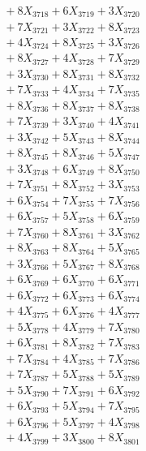 \documentclass[a4paper,10pt]{article}
\begin{document}
{\begin{align}
&\;  + 8 X_{3718} + 6 X_{3719} + 3 X_{3720} \\[0.3ex]
&\;  + 7 X_{3721} + 3 X_{3722} + 8 X_{3723} \\[0.3ex]
&\;  + 4 X_{3724} + 8 X_{3725} + 3 X_{3726} \\[0.3ex]
&\;  + 8 X_{3727} + 4 X_{3728} + 7 X_{3729} \\[0.5ex]\allowbreak
&\;  + 3 X_{3730} + 8 X_{3731} + 8 X_{3732} \\[0.3ex]
&\;  + 7 X_{3733} + 4 X_{3734} + 7 X_{3735} \\[0.3ex]
&\;  + 8 X_{3736} + 8 X_{3737} + 8 X_{3738} \\[0.3ex]
&\;  + 7 X_{3739} + 3 X_{3740} + 4 X_{3741} \\[0.3ex]
&\;  + 3 X_{3742} + 5 X_{3743} + 8 X_{3744} \\[0.3ex]
&\;  + 8 X_{3745} + 8 X_{3746} + 5 X_{3747} \\[0.3ex]
&\;  + 3 X_{3748} + 6 X_{3749} + 8 X_{3750} \\[0.3ex]
&\;  + 7 X_{3751} + 8 X_{3752} + 3 X_{3753} \\[0.3ex]
&\;  + 6 X_{3754} + 7 X_{3755} + 7 X_{3756} \\[0.3ex]
&\;  + 6 X_{3757} + 5 X_{3758} + 6 X_{3759} \\[0.5ex]\allowbreak
&\;  + 7 X_{3760} + 8 X_{3761} + 3 X_{3762} \\[0.3ex]
&\;  + 8 X_{3763} + 8 X_{3764} + 5 X_{3765} \\[0.3ex]
&\;  + 3 X_{3766} + 5 X_{3767} + 8 X_{3768} \\[0.3ex]
&\;  + 6 X_{3769} + 6 X_{3770} + 6 X_{3771} \\[0.3ex]
&\;  + 6 X_{3772} + 6 X_{3773} + 6 X_{3774} \\[0.3ex]
&\;  + 4 X_{3775} + 6 X_{3776} + 4 X_{3777} \\[0.3ex]
&\;  + 5 X_{3778} + 4 X_{3779} + 7 X_{3780} \\[0.3ex]
&\;  + 6 X_{3781} + 8 X_{3782} + 7 X_{3783} \\[0.3ex]
&\;  + 7 X_{3784} + 4 X_{3785} + 7 X_{3786} \\[0.3ex]
&\;  + 7 X_{3787} + 5 X_{3788} + 5 X_{3789} \\[0.5ex]\allowbreak
&\;  + 5 X_{3790} + 7 X_{3791} + 6 X_{3792} \\[0.3ex]
&\;  + 6 X_{3793} + 5 X_{3794} + 7 X_{3795} \\[0.3ex]
&\;  + 6 X_{3796} + 5 X_{3797} + 4 X_{3798} \\[0.3ex]
&\;  + 4 X_{3799} + 3 X_{3800} + 8 X_{3801} \\[0.3ex]

\end{align}}
\end{document}
